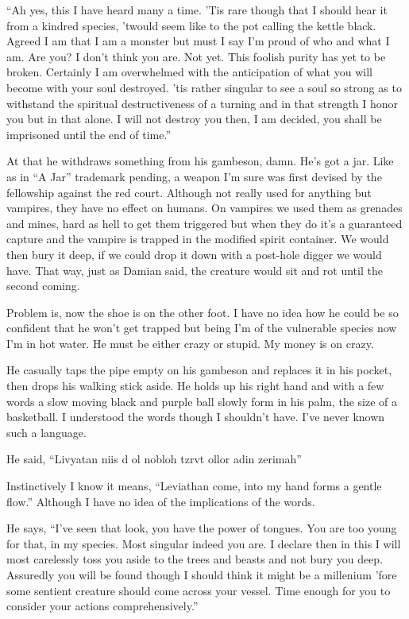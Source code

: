 ``Ah yes, this I have heard many a time. 'Tis rare though that I should hear it from a kindred species, 'twould seem like to the pot calling the kettle black. Agreed I am that I am a monster but must I say I'm proud of who and what I am. Are you? I don't think you are. Not yet. This foolish purity has yet to be broken. Certainly I am overwhelmed with the anticipation of what you will become with your soul destroyed. 'tis rather singular to see a soul so strong as to withstand the spiritual destructiveness of a turning and in that strength I honor you but in that alone. I will not destroy you then, I am decided, you shall be imprisoned until the end of time.''

At that he withdraws something from his gambeson, damn. He's got a jar. Like as in ``A Jar'' trademark pending, a weapon I'm sure was first devised by the fellowship against the red court. Although not really used for anything but vampires, they have no effect on humans. On vampires we used them as grenades and mines, hard as hell to get them triggered but when they do it's a guaranteed capture and the vampire is trapped in the modified spirit container. We would then bury it deep, if we could drop it down with a post-hole digger we would have. That way, just as Damian said, the creature would sit and rot until the second coming.

Problem is, now the shoe is on the other foot. I have no idea how he could be so confident that he won't get trapped but being I'm of the vulnerable species now I'm in hot water. He must be either crazy or stupid. My money is on crazy.

He casually taps the pipe empty on his gambeson and replaces it in his pocket, then drops his walking stick aside. He holds up his right hand and with a few words a slow moving black and purple ball slowly form in his palm, the size of a basketball. I understood the words though I shouldn't have. I've never known such a language.

He said, ``Livyatan niis d ol nobloh tzrvt ollor adin zerimah''

Instinctively I know it means, ``Leviathan come, into my hand forms a gentle flow.'' Although I have no idea of the implications of the words.

He says, ``I've seen that look, you have the power of tongues. You are too young for that, in my species. Most singular indeed you are. I declare then in this I will most carelessly toss you aside to the trees and beasts and not bury you deep. Assuredly you will be found though I should think it might be a millenium 'fore some sentient creature should come across your vessel. Time enough for you to consider your actions comprehensively.''

